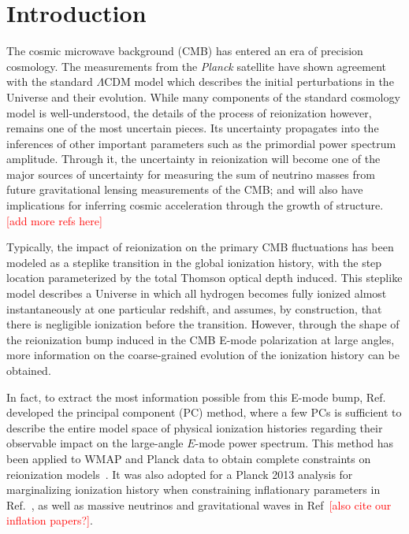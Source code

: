 \documentclass[prd,twocolumn,amsmath,amssymb,floatfix,superscriptaddress,nofootinbib]{revtex4-1}
\newcommand{\ch}[1]{\textcolor{red}{#1}}
\begin{document}
\maketitle




\section{Introduction}
\label{sec:intro}

The cosmic microwave background (CMB) has entered an era of precision cosmology. The measurements from the \textit{Planck} satellite have shown agreement with the standard $\Lambda$CDM model which describes the initial perturbations in the Universe and their evolution. While many components of the standard cosmology model is well-understood, the details of the process of reionization however, remains one of the most uncertain pieces. Its uncertainty propagates into the inferences of other important parameters such as the primordial power spectrum amplitude. Through it, the uncertainty in reionization will become one of the major sources of uncertainty for measuring the sum of neutrino masses from future gravitational lensing measurements of the CMB; and will also have implications for inferring cosmic acceleration through the growth of structure. \ch{[add more refs here]}

Typically, the impact of reionization on the primary CMB fluctuations has been modeled as a steplike transition in the global ionization history, with the step location parameterized by the total Thomson optical depth induced. This steplike model describes a Universe in which all hydrogen becomes fully ionized almost instantaneously at one particular redshift, and assumes, by construction, that there is negligible ionization before the transition. However, through the shape of the reionization bump induced in the CMB E-mode polarization at large angles, more information on the coarse-grained evolution of the ionization history can be obtained. 

In fact, to extract the most information possible from this E-mode bump, Ref.~\cite{Hu:2003gh, Mortonson:2007hq} developed the principal component (PC) method, where a few PCs is sufficient to describe the entire model space of physical ionization histories regarding their observable impact on the large-angle $E$-mode power spectrum. This method has been applied to WMAP and Planck data to obtain complete constraints on reionization models~\cite{Mortonson:2008rx, Mortonson:2007hq, Heinrich:2016ojb, Aghanim:2018eyx}. It was also adopted for a Planck 2013 analysis for marginalizing ionization history when constraining inflationary parameters in Ref.~\cite{Planck:2013jfk}, as well as massive neutrinos and gravitational waves in Ref~\cite{Dai:2015dwa}\ch{[also cite our inflation papers?]}. 
\end{document}
